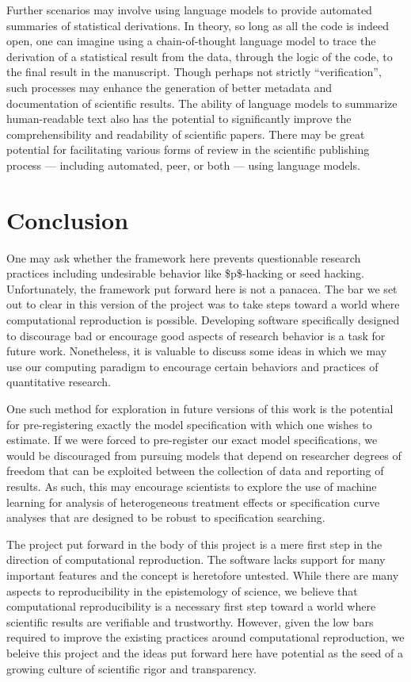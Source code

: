 Further scenarios may involve using language models to provide automated summaries of statistical derivations. In theory, so long as all the code is indeed open, one can imagine using a chain-of-thought language model to trace the derivation of a statistical result from the data, through the logic of the code, to the final result in the manuscript. Though perhaps not strictly ``verification'', such processes may enhance the generation of better metadata and documentation of scientific results. The ability of language models to summarize human-readable text also has the potential to significantly improve the comprehensibility and readability of scientific papers. There may be great potential for facilitating various forms of review in the scientific publishing process --- including automated, peer, or both --- using language models.

\hypertarget{conclusion}{%
\section{Conclusion}\label{conclusion}}

One may ask whether the framework here prevents questionable research practices including undesirable behavior like \$p\$-hacking or seed hacking. Unfortunately, the framework put forward here is not a panacea. The bar we set out to clear in this version of the project was to take steps toward a world where computational reproduction is possible. Developing software specifically designed to discourage bad or encourage good aspects of research behavior is a task for future work. Nonetheless, it is valuable to discuss some ideas in which we may use our computing paradigm to encourage certain behaviors and practices of quantitative research.

One such method for exploration in future versions of this work is the potential for pre-registering exactly the model specification with which one wishes to estimate. If we were forced to pre-register our exact model specifications, we would be discouraged from pursuing models that depend on researcher degrees of freedom that can be exploited between the collection of data and reporting of results. As such, this may encourage scientists to explore the use of machine learning for analysis of heterogeneous treatment effects or specification curve analyses that are designed to be robust to specification searching. 

The project put forward in the body of this project is a mere first step in the direction of computational reproduction. The software lacks support for many important features and the concept is heretofore untested. While there are many aspects to reproducibility in the epistemology of science, we believe that computational reproducibility is a necessary first step toward a world where scientific results are verifiable and trustworthy. However, given the low bars required to improve the existing practices around computational reproduction, we beleive this project and the ideas put forward here have potential as the seed of a growing culture of scientific rigor and transparency. 
